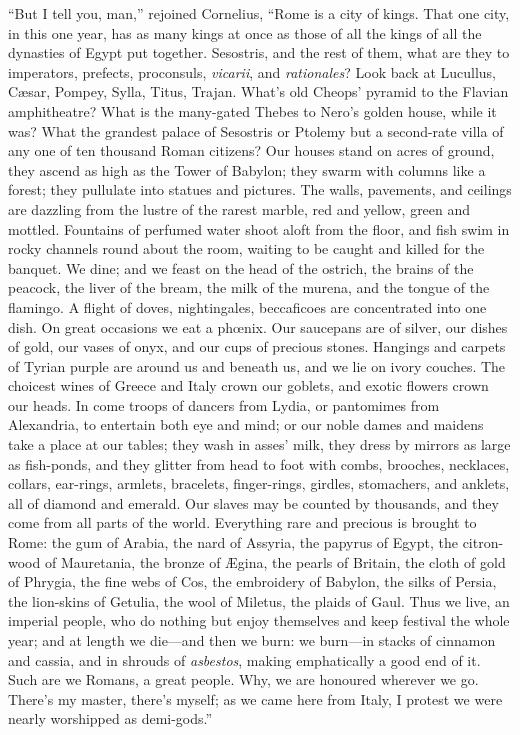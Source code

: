 ``But I tell you, man,'' rejoined Cornelius, ``Rome is
a city of kings. That one city, in this one year, has as many kings at
once as those of all the kings of all the dynasties of Egypt put
together. Sesostris, and the rest of them, what are they to
imperators, prefects, proconsuls, \emph{vicarii}, and \emph{rationales}?
Look back at Lucullus, Cæsar, Pompey, Sylla, Titus, Trajan. What's
old Cheops' pyramid to the Flavian amphitheatre? What is the
many-gated Thebes to Nero's golden house, while it was? What the
grandest palace of Sesostris or Ptolemy but a second-rate villa of any
one of ten thousand Roman citizens? Our houses stand on acres of
ground, they ascend as high as the Tower of Babylon; they swarm with
columns like a forest; they pullulate into statues and pictures. The
walls, pavements, and ceilings are dazzling from the lustre of the
rarest marble, red and yellow, green and mottled. Fountains of
perfumed water shoot aloft from the floor, and fish swim in rocky
channels round about the room, waiting to be caught and killed for the
banquet. We dine; and we feast on the head of the ostrich, the brains
of the peacock, the liver of the bream, the milk of the murena, and
the tongue of the flamingo. A flight of doves, nightingales,
beccaficoes
are concentrated into one dish. On great occasions we eat a phœnix.
Our saucepans are of silver, our dishes of gold, our vases of onyx,
and our cups of precious stones. Hangings and carpets of Tyrian
purple are around us and beneath us, and we lie on ivory couches. The
choicest wines of Greece and Italy crown our goblets, and exotic
flowers crown our heads. In come troops of dancers from Lydia, or
pantomimes from Alexandria, to entertain both eye and mind; or our
noble dames and maidens take a place at our tables; they wash in asses'
milk, they dress by mirrors as large as fish-ponds, and they glitter
from head to foot with combs, brooches, necklaces, collars, ear-rings,
armlets, bracelets, finger-rings, girdles, stomachers, and anklets,
all of diamond and emerald. Our slaves may be counted by thousands,
and they come from all parts of the world. Everything rare and
precious is brought to Rome: the gum of Arabia, the nard of Assyria,
the papyrus of Egypt, the citron-wood of Mauretania, the bronze of
Ægina, the pearls of Britain, the cloth of gold of Phrygia, the fine
webs of Cos, the embroidery of Babylon, the silks of Persia, the
lion-skins of Getulia, the wool of Miletus, the plaids of Gaul. Thus
we live, an imperial people, who do nothing but enjoy themselves and
keep festival the whole year; and at length we die—and then we burn:
we burn—in stacks of cinnamon and cassia, and in shrouds of \emph{asbestos},
making emphatically a good end of it. Such are we Romans, a great
people. Why, we are honoured wherever we go. There's my master,
there's myself; as we came here from Italy, I protest we were nearly
worshipped as demi-gods.''

